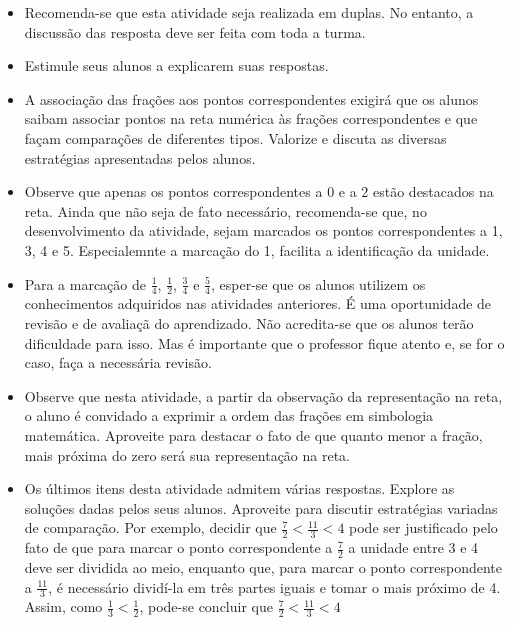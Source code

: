 \begin{multicols}{2}
\begin{itemize}
    \item       Recomenda-se que esta atividade seja realizada em duplas. No entanto, a discussão das resposta deve ser feita com toda a turma.
    \item       Estimule seus alunos a explicarem suas respostas.
    \item       A associação das frações aos pontos correspondentes exigirá que os alunos saibam associar pontos na reta numérica às frações correspondentes e que façam comparações de diferentes tipos. Valorize e discuta as diversas estratégias apresentadas pelos alunos. 
    \item       Observe que apenas os pontos correspondentes a       $0$       e a       $2$       estão destacados na reta. Ainda que não seja de fato necessário, recomenda-se que, no desenvolvimento da atividade, sejam marcados os pontos correspondentes a 1, 3, 4 e 5. Especialemnte a marcação do 1, facilita a identificação da unidade.
    \item       Para a marcação de       $\frac{1}{4}$,       $\frac{1}{2}$,       $\frac{3}{4}$       e       $\frac{5}{4}$, esper-se que os alunos utilizem os conhecimentos adquiridos nas atividades anteriores. É uma oportunidade de revisão e de avaliaçã do aprendizado. Não acredita-se que os alunos terão dificuldade para isso. Mas é importante que o professor fique atento e, se for o caso, faça a necessária revisão. 
    \item       Observe que nesta atividade, a partir da observação da representação na reta, o aluno é convidado a exprimir a ordem das frações em simbologia matemática. Aproveite para destacar o fato de que quanto menor a fração, mais próxima do zero será sua representação na reta. 
    \item       Os últimos itens desta atividade admitem várias respostas. Explore as soluções dadas pelos seus alunos. Aproveite para discutir estratégias variadas de comparação. Por exemplo, decidir que       $\frac{7}{2} < \frac{11}{3} < 4$       pode ser justificado pelo fato de que para marcar o ponto correspondente a       $\frac{7}{2}$       a unidade entre 3 e 4 deve ser dividida ao meio, enquanto que, para marcar o ponto correspondente a       $\frac{11}{3}$, é necessário dividí-la em três partes iguais e tomar o mais próximo de 4. Assim, como       $\frac{1}{3} < \frac{1}{2}$, pode-se concluir que       $\frac{7}{2} < \frac{11}{3} < 4$
\end{itemize} %
  


\end{multicols}
